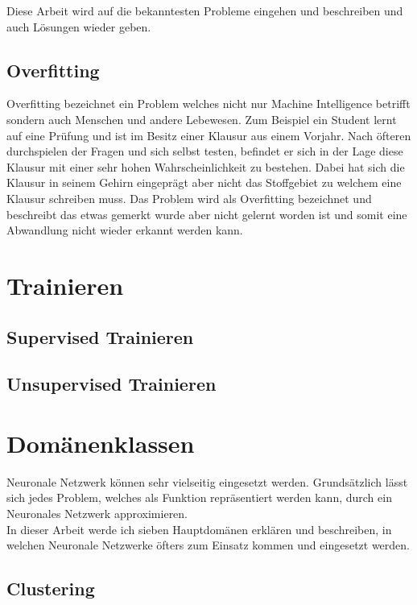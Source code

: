 Diese Arbeit wird auf die bekanntesten Probleme eingehen und beschreiben und auch Lösungen wieder geben.

\subsection{Overfitting}

Overfitting bezeichnet ein Problem welches nicht nur Machine Intelligence betrifft sondern auch Menschen und andere Lebewesen. Zum Beispiel ein Student lernt auf eine Prüfung und ist im Besitz einer Klausur aus einem Vorjahr. Nach öfteren durchspielen der Fragen und sich selbst testen, befindet er sich in der Lage diese Klausur mit einer sehr hohen Wahrscheinlichkeit zu bestehen. Dabei hat sich die Klausur in seinem Gehirn eingeprägt aber nicht das Stoffgebiet zu welchem eine Klausur schreiben muss. Das Problem wird als Overfitting bezeichnet und beschreibt das etwas gemerkt wurde aber nicht gelernt worden ist und somit eine Abwandlung nicht wieder erkannt werden kann.

\section{Trainieren}

\subsection{Supervised Trainieren}

\subsection{Unsupervised Trainieren}

\section{Domänenklassen}

Neuronale Netzwerk können sehr vielseitig eingesetzt werden. Grundsätzlich lässt sich jedes Problem, welches als Funktion repräsentiert werden kann, durch ein Neuronales Netzwerk approximieren. \\

In dieser Arbeit werde ich sieben Hauptdomänen erklären und beschreiben, in welchen Neuronale Netzwerke öfters zum Einsatz kommen und eingesetzt werden.

\subsection{Clustering}

